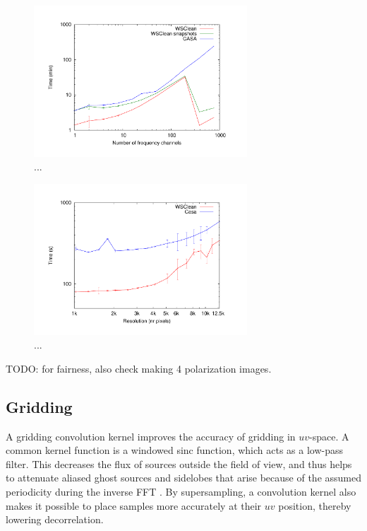 \documentclass[useAMS,usenatbib]{mn2e}
\begin{document}
\begin{figure}
\begin{center}
\includegraphics[width=8cm]{img/benchmark-channels/channels}
\caption{...}
\label{fig:timing-channels}
\end{center}
\end{figure}

\begin{figure}
\begin{center}
\includegraphics[width=8cm]{img/benchmark-resolution/resolution}
\caption{...}
\label{fig:timing-resolution}
\end{center}
\end{figure}

TODO: for fairness, also check making 4 polarization images.

\subsection{Gridding} \label{sec:gridding}
A gridding convolution kernel improves the accuracy of gridding in $uv$-space. A common kernel function is a windowed sinc function, which acts as a low-pass filter. This decreases the flux of sources outside the field of view, and thus helps to attenuate aliased ghost sources and sidelobes that arise because of the assumed periodicity during the inverse FFT \citep{post-correlation-filtering}. By supersampling, a convolution kernel also makes it possible to place samples more accurately at their $uv$ position, thereby lowering decorrelation.
\end{document}
